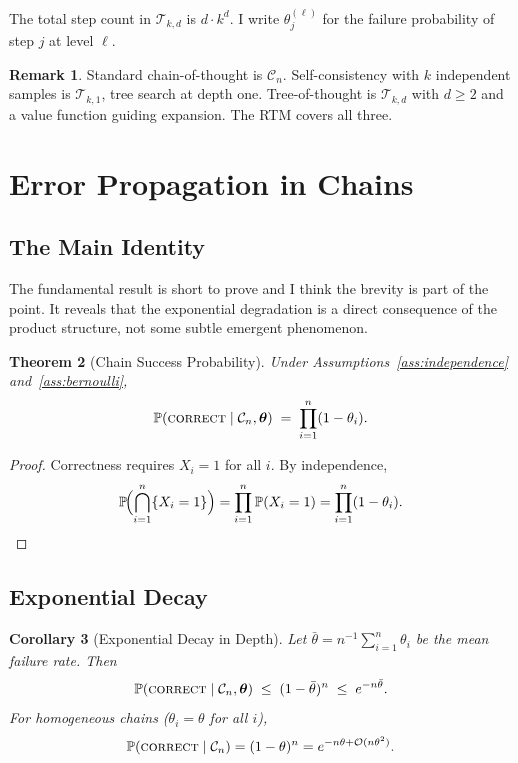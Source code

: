 \documentclass[11pt]{article}
\theoremstyle{plain}
\newtheorem{theorem}{Theorem}[section]
\newtheorem{corollary}[theorem]{Corollary}
\theoremstyle{definition}
\newtheorem{remark}[theorem]{Remark}
\newcommand{\Prob}{\mathbb{P}}
\newcommand{\tree}{\mathcal{T}}
\newcommand{\chain}{\mathcal{C}}
\newcommand{\thetavec}{\bm{\theta}}
\newcommand{\correct}{\textsc{correct}}
\newcommand{\BigO}{\mathcal{O}}
\begin{document}
The total step count in $\tree_{k,d}$ is $d \cdot k^d$. I write
$\theta^{(\ell)}_j$ for the failure probability of step $j$ at level $\ell$.

\begin{remark}
Standard chain-of-thought is $\chain_n$. Self-consistency with $k$ independent
samples \citep{wang2022self} is $\tree_{k,1}$, tree search at depth one.
Tree-of-thought \citep{yao2023tree} is $\tree_{k,d}$ with $d \geq 2$ and a
value function guiding expansion. The RTM covers all three.
\end{remark}

\section{Error Propagation in Chains}
\label{sec:chains}

\subsection{The Main Identity}

The fundamental result is short to prove and I think the brevity is part of
the point. It reveals that the exponential degradation is a direct consequence
of the product structure, not some subtle emergent phenomenon.

\begin{theorem}[Chain Success Probability]\label{thm:chain}
  Under Assumptions~\ref{ass:independence} and~\ref{ass:bernoulli},
  \[
    \Prob(\correct \mid \chain_n, \thetavec)
    \;=\; \prod_{i=1}^n (1 - \theta_i).
  \]
\end{theorem}

\begin{proof}
  Correctness requires $X_i = 1$ for all $i$. By independence,
  \[
    \Prob\!\Bigl(\bigcap_{i=1}^n \{X_i = 1\}\Bigr)
    = \prod_{i=1}^n \Prob(X_i = 1)
    = \prod_{i=1}^n (1-\theta_i). \qedhere
  \]
\end{proof}

\subsection{Exponential Decay}

\begin{corollary}[Exponential Decay in Depth]\label{cor:decay}
  Let $\bar\theta = n^{-1}\sum_{i=1}^n \theta_i$ be the mean failure rate. Then
  \[
    \Prob(\correct \mid \chain_n, \thetavec) \;\leq\; (1-\bar\theta)^n \;\leq\; e^{-n\bar\theta}.
  \]
  For homogeneous chains ($\theta_i = \theta$ for all $i$),
  \[
    \Prob(\correct \mid \chain_n) = (1-\theta)^n = e^{-n\theta + \BigO(n\theta^2)}.
  \]
\end{corollary}
\end{document}
